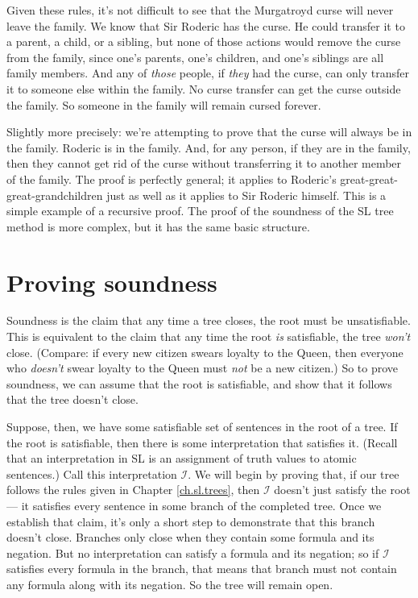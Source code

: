 Given these rules, it's not difficult to see that the Murgatroyd curse will never leave the family. We know that Sir Roderic has the curse. He could transfer it to a parent, a child, or a sibling, but none of those actions would remove the curse from the family, since one's parents, one's children, and one's siblings are all family members. And any of \emph{those} people, if \emph{they} had the curse, can only transfer it to someone else within the family. No curse transfer can get the curse outside the family. So someone in the family will remain cursed forever.

Slightly more precisely: we're attempting to prove that the curse will always be in the family. Roderic is in the family. And, for any person, if they are in the family, then they cannot get rid of the curse without transferring it to another member of the family. The proof is perfectly general; it applies to Roderic's great-great-great-grandchildren just as well as it applies to Sir Roderic himself. This is a simple example of a recursive proof. The proof of the soundness of the SL tree method is more complex, but it has the same basic structure.

\section{Proving soundness}

Soundness is the claim that any time a tree closes, the root must be unsatisfiable. This is equivalent to the claim that any time the root \emph{is} satisfiable, the tree \emph{won't} close. (Compare: if every new citizen swears loyalty to the Queen, then everyone who \emph{doesn't} swear loyalty to the Queen must \emph{not} be a new citizen.) So to prove soundness, we can assume that the root is satisfiable, and show that it follows that the tree doesn't close.

Suppose, then, we have some satisfiable set of sentences \metaSetX{} in the root of a tree. If the root is satisfiable, then there is some interpretation that satisfies it. (Recall that an interpretation in SL is an assignment of truth values to atomic sentences.) Call this interpretation $\mathcal{I}$. We will begin by proving that, if our tree follows the rules given in Chapter \ref{ch.sl.trees}, then $\mathcal{I}$ doesn't just satisfy the root --- it satisfies every sentence in some branch of the completed tree. Once we establish that claim, it's only a short step to demonstrate that this branch doesn't close. Branches only close when they contain some formula and its negation. But no interpretation can satisfy a formula and its negation; so if $\mathcal{I}$ satisfies every formula in the branch, that means that branch must not contain any formula along with its negation. So the tree will remain open.

